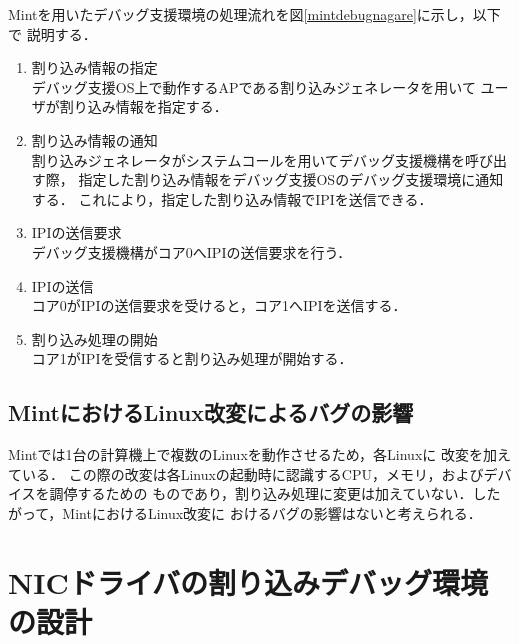 \documentclass[tanilab-enum]{graduate}
\begin{document}
Mintを用いたデバッグ支援環境の処理流れを図\ref{mintdebugnagare}に示し，以下で
説明する．
\begin{enumerate}
    \item 割り込み情報の指定\\
        デバッグ支援OS上で動作するAPである割り込みジェネレータを用いて
        ユーザが割り込み情報を指定する．
    \item 割り込み情報の通知\\
        割り込みジェネレータがシステムコールを用いてデバッグ支援機構を呼び出す際，
        指定した割り込み情報をデバッグ支援OSのデバッグ支援環境に通知する．
        これにより，指定した割り込み情報でIPIを送信できる．
    \item IPIの送信要求\\
        デバッグ支援機構がコア0へIPIの送信要求を行う．
    \item IPIの送信\\
        コア0がIPIの送信要求を受けると，コア1へIPIを送信する．
    \item 割り込み処理の開始\\
        コア1がIPIを受信すると割り込み処理が開始する．
\end{enumerate}
\section{MintにおけるLinux改変によるバグの影響}
Mintでは1台の計算機上で複数のLinuxを動作させるため，各Linuxに
改変を加えている\cite{kitagawa}．
この際の改変は各Linuxの起動時に認識するCPU，メモリ，およびデバイスを調停するための
ものであり，割り込み処理に変更は加えていない．したがって，MintにおけるLinux改変に
おけるバグの影響はないと考えられる．
\chapter{NICドライバの割り込みデバッグ環境の設計}\label{chap:plan}
\end{document}

